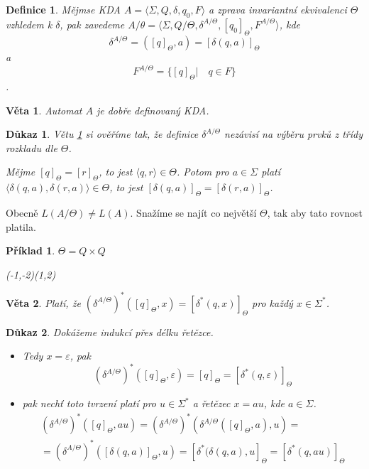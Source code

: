 \documentclass[10pt, a4paper, titlepage]{article}
\theoremstyle{note}
\newtheorem{veta}{\textbf{Věta}}
\newtheorem{definice}{\textbf{Definice}}
\newtheorem{dukaz}{\textbf{Důkaz}}
\newtheorem{priklad}{\textbf{Příklad}}
\begin{document}
\begin{definice}
Mějmse KDA $A = \langle \Sigma, Q, \delta, q_{0}, F \rangle$ a zprava invariantní ekvivalenci $\Theta$ vzhledem k
$\delta$, pak zavedeme $A/\theta = \langle \Sigma, Q/\Theta, \delta^{A/\Theta}, [q_{0}]_{\Theta}, F^{A/\Theta} \rangle$, kde
$$\delta^{A/\Theta} = ([q]_{\Theta}, a) = [\delta(q, a)]_{\Theta}$$
a
$$F^{A/\Theta} = \lbrace [q]_{\Theta} | \quad q \in F \rbrace$$.
\end{definice}

\begin{veta}\label{veta-aut}
Automat $A$ je dobře definovaný KDA.
\end{veta}

\begin{dukaz}
Větu \ref{veta-aut} si ověříme tak, že definice $\delta^{A/\Theta}$ nezávisí na výběru prvků z třídy rozkladu
dle $\Theta$.

Mějme $[q]_\Theta = [r]_\Theta$,  to jest $\langle q,r \rangle \in \Theta$. Potom pro $a \in \Sigma$ platí $\langle \delta(q,a), \delta(r,a) \rangle \in \Theta$, to jest $[ \delta(q,a)]_\Theta = [ \delta(r,a)]_\Theta$.
\end{dukaz}

Obecně $L(A/\Theta) \neq L(A)$. Snažíme se najít co největší $\Theta$, tak aby tato rovnost platila.

\begin{priklad}
$\Theta = Q \times Q$
\begin{center}
\begin{VCPicture}{(-1,-2)(1,2)}
\end{VCPicture}
\end{center}

\end{priklad}

\begin{veta}\label{veta-x2}
Platí, že $(\delta^{A/\Theta})^*([q]_\Theta,x)=[\delta^*(q,x)]_\Theta$ pro každý $x \in \Sigma^*$.
\end{veta}

\begin{dukaz}
Dokážeme indukcí přes délku řetězce.
\begin{itemize}
\item
Tedy $x = \varepsilon$, pak
$$(\delta^{A/ \Theta})^{*}([q]_\Theta,\varepsilon)=[q]_\Theta=[\delta^{*}(q,\varepsilon)]_\Theta$$

\item
pak nechť toto tvrzení platí pro $u \in \Sigma^{*}$ a řetězec $x = au$, kde $a \in \Sigma$.
\begin{gather*}
(\delta^{A/ \Theta})^{*}([q]_{\Theta}, au) = (\delta^{A/ \Theta})^{*}(\delta^{A/ \Theta} ([q]_{\Theta}, a), u ) = \\
= (\delta^{A/ \Theta})^{*} ([\delta(q, a)]_{\Theta}, u) = [\delta^{*} (\delta(q, a), u]_{\Theta} = [\delta^{*} (q, au)]_{\Theta}
\end{gather*}
\end{itemize}
\end{dukaz}
\end{document}
